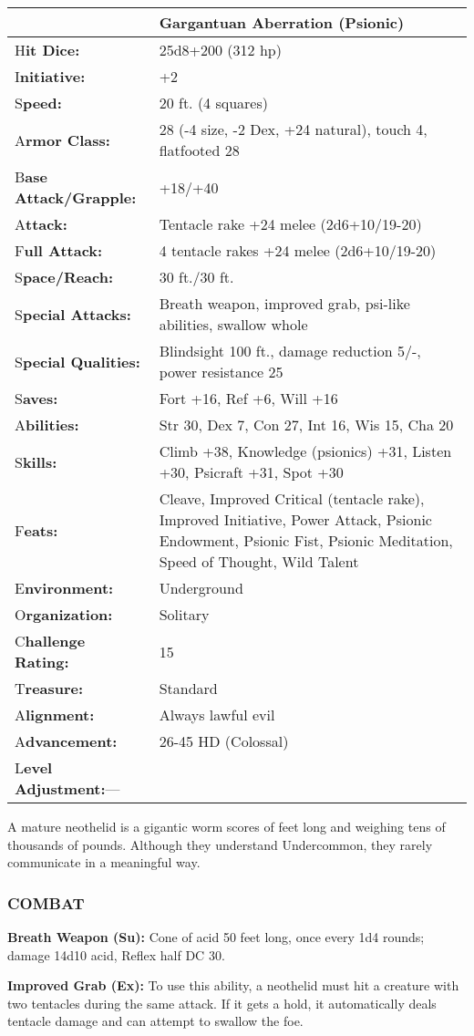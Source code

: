 \documentclass{article}
\begin{document}
\begin{tabular}{|>{\raggedright}p{76pt}|>{\raggedright}p{250pt}|}
\hline
  & Gargantuan Aberration (Psionic)\tabularnewline
\hline
H\textbf{it Dice:} & 25d8+200 (312 hp)\tabularnewline
\hline
I\textbf{nitiative:} & +2\tabularnewline
\hline
S\textbf{peed:} & 20 ft. (4 squares)\tabularnewline
\hline
A\textbf{rmor Class:} & 28 (-4 size, -2 Dex, +24 natural), touch 4, flatfooted 
28\tabularnewline
\hline
B\textbf{ase Attack/Grapple:} & +18/+40\tabularnewline
\hline
A\textbf{ttack:} & Tentacle rake +24 melee (2d6+10/19-20)\tabularnewline
\hline
F\textbf{ull Attack:} & 4 tentacle rakes +24 melee (2d6+10/19-20)\tabularnewline
\hline
S\textbf{pace/Reach:} & 30 ft./30 ft.\tabularnewline
\hline
S\textbf{pecial Attacks:} & Breath weapon, improved grab, psi-like abilities, swallow 
whole\tabularnewline
\hline
S\textbf{pecial Qualities:} & Blindsight 100 ft., damage reduction 5/-, power resistance 
25\tabularnewline
\hline
S\textbf{aves:} & Fort +16, Ref +6, Will +16\tabularnewline
\hline
A\textbf{bilities:} & Str 30, Dex 7, Con 27, Int 16, Wis 15, Cha 20\tabularnewline
\hline
S\textbf{kills:} & Climb +38, Knowledge (psionics) +31, Listen +30, Psicraft +31, 
Spot +30\tabularnewline
\hline
F\textbf{eats:} & Cleave, Improved Critical (tentacle rake), Improved Initiative, 
Power Attack, Psionic Endowment, Psionic Fist, Psionic Meditation, Speed of Thought, 
Wild Talent\tabularnewline
\hline
E\textbf{nvironment:} & Underground\tabularnewline
\hline
O\textbf{rganization:} & Solitary\tabularnewline
\hline
C\textbf{hallenge Rating:} & 15\tabularnewline
\hline
T\textbf{reasure:} & Standard\tabularnewline
\hline
A\textbf{lignment:} & Always lawful evil\tabularnewline
\hline
A\textbf{dvancement:} & 26-45 HD (Colossal)\tabularnewline
\hline
L\textbf{evel Adjustment:}--- & \tabularnewline
\hline
\end{tabular}

A mature neothelid is a gigantic worm scores of feet long and weighing tens of 
thousands of pounds. Although they understand Undercommon, they rarely communicate 
in a meaningful way.

\subsubsection*{COMBAT}

\textbf{Breath Weapon (Su): }Cone of acid 50 feet long, once every 1d4 rounds; 
damage 14d10 acid, Reflex half DC 30. 

\textbf{Improved Grab (Ex): }To use this ability, a neothelid must hit a creature 
with two tentacles during the same attack. If it gets a hold, it automatically 
deals tentacle damage and can attempt to swallow the foe. 
\end{document}
